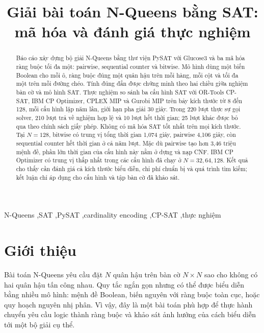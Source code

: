 \documentclass[a4paper,fleqn]{cas-sc}
\begin{document}
\pagestyle{cas}
\let\WriteBookmarks\relax
{}
\title[mode=title]{Giải bài toán N-Queens bằng SAT:\texorpdfstring{\\}{ }mã hóa và đánh giá thực nghiệm}
\author[1]{\StudentName}
\begin{abstract}
Báo cáo xây dựng bộ giải N-Queens bằng thư viện PySAT với Glucose3 và ba mã hóa ràng buộc tối đa một: pairwise, sequential counter và bitwise. Mô hình dùng một biến Boolean cho mỗi ô, ràng buộc đúng một quân hậu trên mỗi hàng, mỗi cột và tối đa một trên mỗi đường chéo. Tính đúng đắn được chứng minh theo hai chiều giữa nghiệm bàn cờ và mô hình SAT. Thực nghiệm so sánh ba cấu hình SAT với OR-Tools CP-SAT, IBM CP Optimizer, CPLEX MIP và Gurobi MIP trên bảy kích thước từ 8 đến 128, mỗi cấu hình lặp năm lần, giới hạn pha giải 30 giây. Trong 220 lượt thực sự gọi solver, 210 lượt trả về nghiệm hợp lệ và 10 lượt hết thời gian; 25 lượt khác được bỏ qua theo chính sách giấy phép. Không có mã hóa SAT tốt nhất trên mọi kích thước. Tại $N=128$, bitwise có trung vị tổng thời gian 1,074 giây, pairwise 4,106 giây, còn sequential counter hết thời gian ở cả năm lượt. Mặc dù pairwise tạo hơn 3,46 triệu mệnh đề, phần lớn thời gian của cấu hình này nằm ở dựng và nạp CNF. IBM CP Optimizer có trung vị thấp nhất trong các cấu hình đã chạy ở $N=32,64,128$. Kết quả cho thấy cần đánh giá cả kích thước biểu diễn, chi phí chuẩn bị và quá trình tìm kiếm; kết luận chỉ áp dụng cho cấu hình và tập bàn cờ đã khảo sát.
\end{abstract}
\begin{keywords}[Từ khóa]
N-Queens \sep SAT \sep PySAT \sep cardinality encoding \sep CP-SAT \sep thực nghiệm
\end{keywords}
\maketitle
{}

\section{Giới thiệu}\label{sec:intro}
Bài toán N-Queens yêu cầu đặt $N$ quân hậu trên bàn cờ $N\times N$ sao cho không có hai quân hậu tấn công nhau. Quy tắc ngắn gọn nhưng có thể được biểu diễn bằng nhiều mô hình: mệnh đề Boolean, biến nguyên với ràng buộc toàn cục, hoặc quy hoạch nguyên nhị phân. Vì vậy, đây là một bài toán phù hợp để thực hành chuyển yêu cầu logic thành ràng buộc và khảo sát ảnh hưởng của cách biểu diễn tới một bộ giải cụ thể.
\end{document}
